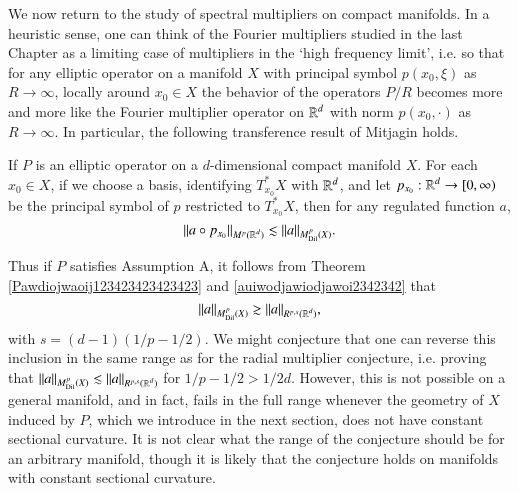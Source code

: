 We now return to the study of spectral multipliers on compact manifolds. In a heuristic sense, one can think of the Fourier multipliers studied in the last Chapter as a limiting case of multipliers in the `high frequency limit', i.e. so that for any elliptic operator on a manifold $X$ with principal symbol $p(x_0,\xi)$ as $R \to \infty$, locally around $x_0 \in X$ the behavior of the operators $P/R$ becomes more and more like the Fourier multiplier operator on $\operatorname{\mathbb{R}}^d$ with norm $p(x_0,\cdot)$ as $R \to \infty$. In particular, the following transference result of Mitjagin \cite{Mitjagin} holds.

\begin{theorem} \label{Pawdiojwaoij123423423423423}
  If $P$ is an elliptic operator on a $d$-dimensional compact manifold $X$. For each $x_0 \in X$, if we choose a basis, identifying $T_{x_0}^* X$ with $\operatorname{\mathbb{R}}^d$, and let $p_{x_0}: \operatorname{\mathbb{R}}^d \to [0,\infty)$ be the principal symbol of $p$ restricted to $T_{x_0}^* X$, then for any regulated function $a$,
  \[ \| a \circ p_{x_0} \|_{M^p(\operatorname{\mathbb{R}}^d)} \lesssim \| a \|_{M^p_{\text{Dil}}(X)}. \]
\end{theorem}

Thus if $P$ satisfies Assumption A, it follows from Theorem \ref{Pawdiojwaoij123423423423423} and \eqref{auiwodjawiodjawoi2342342} that
%
\begin{equation} \label{upperboundawdoiwjdoawi}
  \| a \|_{M^p_{\text{Dil}}(X)} \gtrsim \| a \|_{R^{p,s}(\operatorname{\mathbb{R}}^d)},
\end{equation}
%
with $s = (d-1)(1/p - 1/2)$. We might conjecture that one can reverse this inclusion in the same range as for the radial multiplier conjecture, i.e. proving that $\| a \|_{M^p_{\text{Dil}}(X)} \lesssim \| a \|_{R^{p,s}(\operatorname{\mathbb{R}}^d)}$ for $1/p - 1/2 > 1/2d$. However, this is not possible on a general manifold, and in fact, fails in the full range whenever the geometry of $X$ induced by $P$, which we introduce in the next section, does not have constant sectional curvature. It is not clear what the range of the conjecture should be for an arbitrary manifold, though it is likely that the conjecture holds on manifolds with constant sectional curvature.

